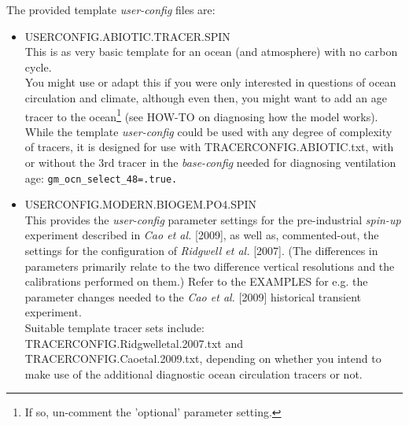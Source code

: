 \vspace{2mm}

The provided template \textit{user-config} files are:

\begin{itemize}[noitemsep]

\vspace{2mm}
\item \textsf{\small USERCONFIG.ABIOTIC.TRACER.SPIN}
\vspace{1mm}
\\This is as very basic template for an ocean (and atmosphere) with no carbon cycle.
\\You might use or adapt this if you were only interested in questions of ocean circulation and climate, although even then, you might want to add an age tracer to the ocean\footnote{If so, un-comment the 'optional' parameter setting.} (see HOW-TO on diagnosing how the model works).\\While the template \textit{user-config} could be used with any degree of complexity of tracers, it is designed for use with \textsf{\footnotesize TRACERCONFIG.ABIOTIC.txt}, with or without the 3rd tracer in the \textit{base-config} needed for diagnosing ventilation age: \texttt{gm\_ocn\_select\_48=.true.}

\vspace{2mm}
\item \textsf{\small USERCONFIG.MODERN.BIOGEM.PO4.SPIN}
\vspace{1mm}
\\This provides the \textit{user-config} parameter settings for the pre-industrial \textit{spin-up} experiment described in \textit{Cao et al.} [2009], as well as, commented-out, the settings for the configuration of \textit{Ridgwell et al.} [2007]. (The differences in parameters primarily relate to the two difference vertical resolutions and the calibrations performed on them.) Refer to the EXAMPLES for e.g. the parameter changes needed to the \textit{Cao et al.} [2009] historical transient experiment.
\\Suitable template tracer sets include: \textsf{\footnotesize TRACERCONFIG.Ridgwelletal.2007.txt} and \linebreak \textsf{\footnotesize TRACERCONFIG.Caoetal.2009.txt}, depending on whether you intend to make use of the additional diagnostic ocean circulation tracers or not.


\end{itemize}
